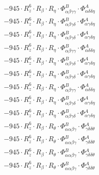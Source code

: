\documentclass{article}
\begin{document}
\begin{subequations}
\begin{gather}
\begin{array}{c}
 \\[0.2em] 		 - 945 \cdot R_{z}^{6} \cdot R_{\beta{}} \cdot R_{\eta{}} \cdot \Phi{}^{B}_{\alpha{}\beta{}\gamma{}\gamma{}} \cdot \Phi{}^{A}_{\alpha{}\delta{}\delta{}\eta{}} 
 \\[0.2em] 		 - 945 \cdot R_{z}^{6} \cdot R_{\beta{}} \cdot R_{\eta{}} \cdot \Phi{}^{B}_{\alpha{}\beta{}\gamma{}\delta{}} \cdot \Phi{}^{A}_{\alpha{}\gamma{}\delta{}\eta{}} 
 \\[0.2em] 		 - 945 \cdot R_{z}^{6} \cdot R_{\beta{}} \cdot R_{\eta{}} \cdot \Phi{}^{B}_{\alpha{}\beta{}\gamma{}\delta{}} \cdot \Phi{}^{A}_{\alpha{}\gamma{}\delta{}\eta{}} 
 \\[0.2em] 		 - 945 \cdot R_{z}^{6} \cdot R_{\beta{}} \cdot R_{\eta{}} \cdot \Phi{}^{B}_{\alpha{}\beta{}\gamma{}\gamma{}} \cdot \Phi{}^{A}_{\alpha{}\delta{}\delta{}\eta{}} 
 \\[0.2em] 		 - 945 \cdot R_{z}^{6} \cdot R_{\beta{}} \cdot R_{\eta{}} \cdot \Phi{}^{B}_{\alpha{}\beta{}\gamma{}\delta{}} \cdot \Phi{}^{A}_{\alpha{}\gamma{}\delta{}\eta{}} 
 \\[0.2em] 		 - 945 \cdot R_{z}^{6} \cdot R_{\beta{}} \cdot R_{\eta{}} \cdot \Phi{}^{B}_{\alpha{}\beta{}\gamma{}\delta{}} \cdot \Phi{}^{A}_{\alpha{}\gamma{}\delta{}\eta{}} 
 \\[0.2em] 		 - 945 \cdot R_{z}^{6} \cdot R_{\beta{}} \cdot R_{\eta{}} \cdot \Phi{}^{B}_{\alpha{}\beta{}\gamma{}\gamma{}} \cdot \Phi{}^{A}_{\alpha{}\delta{}\delta{}\eta{}} 
 \\[0.2em] 		 - 945 \cdot R_{z}^{6} \cdot R_{\beta{}} \cdot R_{\eta{}} \cdot \Phi{}^{B}_{\alpha{}\beta{}\gamma{}\delta{}} \cdot \Phi{}^{A}_{\alpha{}\gamma{}\delta{}\eta{}} 
 \\[0.2em] 		 - 945 \cdot R_{z}^{6} \cdot R_{\beta{}} \cdot R_{\eta{}} \cdot \Phi{}^{B}_{\alpha{}\beta{}\gamma{}\delta{}} \cdot \Phi{}^{A}_{\alpha{}\gamma{}\delta{}\eta{}} 
 \\[0.2em] 		 - 945 \cdot R_{z}^{6} \cdot R_{\beta{}} \cdot R_{\theta{}} \cdot \Phi{}^{B}_{\alpha{}\alpha{}\beta{}\gamma{}} \cdot \Phi{}^{A}_{\gamma{}\delta{}\delta{}\theta{}} 
 \\[0.2em] 		 - 945 \cdot R_{z}^{6} \cdot R_{\beta{}} \cdot R_{\theta{}} \cdot \Phi{}^{B}_{\alpha{}\alpha{}\beta{}\gamma{}} \cdot \Phi{}^{A}_{\gamma{}\delta{}\delta{}\theta{}} 
 \\[0.2em] 		 - 945 \cdot R_{z}^{6} \cdot R_{\beta{}} \cdot R_{\theta{}} \cdot \Phi{}^{B}_{\alpha{}\alpha{}\beta{}\gamma{}} \cdot \Phi{}^{A}_{\gamma{}\delta{}\delta{}\theta{}} 
 \\[0.2em] 		 - 945 \cdot R_{z}^{6} \cdot R_{\beta{}} \cdot R_{\theta{}} \cdot \Phi{}^{B}_{\alpha{}\alpha{}\beta{}\gamma{}} \cdot \Phi{}^{A}_{\gamma{}\delta{}\delta{}\theta{}} 

\end{array}
\end{gather}
\end{subequations}
\end{document}
